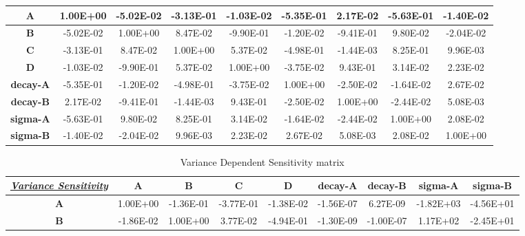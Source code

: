 \begin{landscape}
\begin{table}[h!]
\begin{tabular}{|c|c|c|c|c|c|c|c|c|}
\textbf{A}                          & 1.00E+00   & -5.02E-02  & -3.13E-01  & -1.03E-02  & -5.35E-01        & 2.17E-02         & -5.63E-01        & -1.40E-02        \\ \hline
\textbf{B}                          & -5.02E-02  & 1.00E+00   & 8.47E-02   & -9.90E-01  & -1.20E-02        & -9.41E-01        & 9.80E-02         & -2.04E-02        \\ \hline
\textbf{C}                          & -3.13E-01  & 8.47E-02   & 1.00E+00   & 5.37E-02   & -4.98E-01        & -1.44E-03        & 8.25E-01         & 9.96E-03         \\ \hline
\textbf{D}                          & -1.03E-02  & -9.90E-01  & 5.37E-02   & 1.00E+00   & -3.75E-02        & 9.43E-01         & 3.14E-02         & 2.23E-02         \\ \hline
\textbf{decay-A}                    & -5.35E-01  & -1.20E-02  & -4.98E-01  & -3.75E-02  & 1.00E+00         & -2.50E-02        & -1.64E-02        & 2.67E-02         \\ \hline
\textbf{decay-B}                    & 2.17E-02   & -9.41E-01  & -1.44E-03  & 9.43E-01   & -2.50E-02        & 1.00E+00         & -2.44E-02        & 5.08E-03         \\ \hline
\textbf{sigma-A}                    & -5.63E-01  & 9.80E-02   & 8.25E-01   & 3.14E-02   & -1.64E-02        & -2.44E-02        & 1.00E+00         & 2.08E-02         \\ \hline
\textbf{sigma-B}                    & -1.40E-02  & -2.04E-02  & 9.96E-03   & 2.23E-02   & 2.67E-02         & 5.08E-03         & 2.08E-02         & 1.00E+00         \\ \hline
\end{tabular}
\end{table}
\begin{table}[h!]
\centering
\caption{Variance Dependent Sensitivity matrix}
\label{VarDepSensitivityComputed}
\begin{tabular}{|c|c|c|c|c|c|c|c|c|}
\hline
{\ul \textit{\textbf{Variance Sensitivity}}} & \textbf{A} & \textbf{B} & \textbf{C} & \textbf{D} & \textbf{decay-A} & \textbf{decay-B} & \textbf{sigma-A} & \textbf{sigma-B} \\ \hline
\textbf{A}                                   & 1.00E+00   & -1.36E-01  & -3.77E-01  & -1.38E-02  & -1.56E-07        & 6.27E-09         & -1.82E+03        & -4.56E+01        \\ \hline
\textbf{B}                                   & -1.86E-02  & 1.00E+00   & 3.77E-02   & -4.94E-01  & -1.30E-09        & -1.00E-07        & 1.17E+02         & -2.45E+01        \\ \hline

\end{tabular}
\end{table}
\end{landscape}
